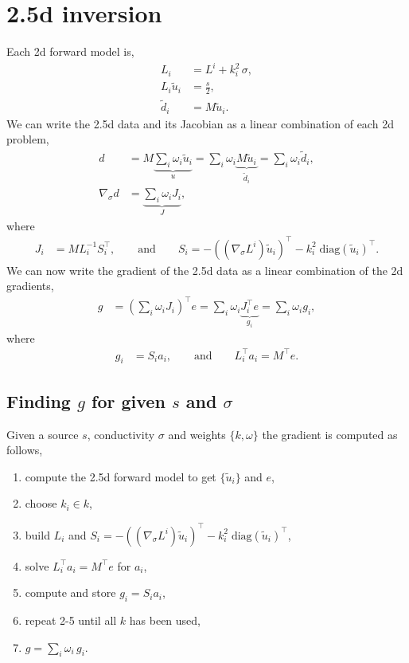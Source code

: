 \documentclass[a4paper,12pt]{article}
\begin{document}
\section*{2.5d inversion}
Each 2d forward model is,
\begin{align*}
L_{i} &= L^{i} + k_i^2\,\sigma, \\
L_{i} \tilde{u}_{i} &= \frac{s}{2}, \\
\tilde{d}_{i} &= M\tilde{u}_{i}.
\end{align*}
We can write the 2.5d data and its Jacobian as a linear combination of each 2d problem,
\begin{align*}
d &= M\underbrace{\sum_i \omega_i \tilde{u}_i}_{u} = \sum_i \omega_i \underbrace{M\tilde{u}_i}_{\tilde{d}_i} = \sum_i \omega_i \tilde{d}_i, \\
\nabla_\sigma d &= \underbrace{\sum_i \omega_i J_i}_{J},
\end{align*}
where
\begin{align*}
J_i &= ML_i^{-1}S_i^{\top}, \hspace{2em}\text{and}\hspace{2em}
S_i = -\left( (\nabla_\sigma L^i)\tilde{u}_i \right)^{\top} - k_i^2 \; \mbox{diag}(\tilde{u}_i)^{\top}.
\end{align*}
We can now write the gradient of the 2.5d data as a linear combination of the 2d gradients,
\begin{align*}
g &= \left( \sum_i \omega_i J_i \right)^\top e = \sum_i \omega_i \underbrace{J_i^\top e}_{g_i} = 
\sum_i \omega_i g_i, 
\end{align*}
where
\begin{align*}
g_i &= S_i a_i, \hspace{2em}\text{and}\hspace{2em}
L_i^{\top}a_i = M^\top e.
\end{align*}
\subsection*{Finding $g$ for given $s$ and $\sigma$}
Given a source $s$, conductivity $\sigma$ and weights $\{k,\omega\}$ the gradient is computed as follows,
\begin{enumerate}
\item compute the 2.5d forward model to get $\{\tilde{u}_{i}\}$ and $e$,
\item choose $k_i\in k$,
\item build $L_{i}$ and $S_{i} = -\left( (\nabla_\sigma L^i)\tilde{u}_{i} \right)^{\top} - k_i^2\; \mbox{diag}(\tilde{u}_{i})^{\top}$,
\item solve $L_{i}^{\top}a_{i} = M^\top e$ for $a_{i}$,
\item compute and store $g_{i} = S_{i} a_{i}$,
\item repeat 2-5 until all $k$ has been used,
\item $g=\sum_i \omega_i \,g_{i}$.
\end{enumerate}
%
\end{document}
